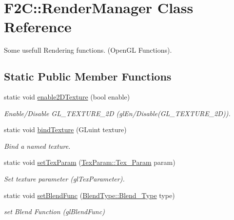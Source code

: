 \hypertarget{class_f2_c_1_1_render_manager}{
\section{F2C::RenderManager Class Reference}
\label{class_f2_c_1_1_render_manager}
}


Some usefull Rendering functions. (OpenGL Functions).  


\subsection*{Static Public Member Functions}
\begin{DoxyCompactItemize}
\item 
static void \hyperlink{class_f2_c_1_1_render_manager_a519be68246884dc808b978f431dd4302}{enable2DTexture} (bool enable)
\begin{DoxyCompactList}\small\item\em Enable/Disable GL\_\-TEXTURE\_\-2D (glEn/Disable(GL\_\-TEXTURE\_\-2D)). \item\end{DoxyCompactList}\item 
static void \hyperlink{class_f2_c_1_1_render_manager_aedad387e3578d59bf64cc0804f90e666}{bindTexture} (GLuint texture)
\begin{DoxyCompactList}\small\item\em Bind a named texture. \item\end{DoxyCompactList}\item 
static void \hyperlink{class_f2_c_1_1_render_manager_a4d0a75735f91eff680102b1f655893f2}{setTexParam} (\hyperlink{namespace_f2_c_1_1_tex_param_a64299c3972944468af4e8b0394c936c6}{TexParam::Tex\_\-Param} param)
\begin{DoxyCompactList}\small\item\em Set texture parameter (glTexParameter). \item\end{DoxyCompactList}\item 
static void \hyperlink{class_f2_c_1_1_render_manager_ae00bc75438b61d38e1203c1eb8e97507}{setBlendFunc} (\hyperlink{namespace_f2_c_1_1_blend_type_a582fe2d83fb813041785794568e5a414}{BlendType::Blend\_\-Type} type)
\begin{DoxyCompactList}\small\item\em set Blend Function (glBlendFunc) \item\end{DoxyCompactList}\item 

\end{DoxyCompactItemize}
